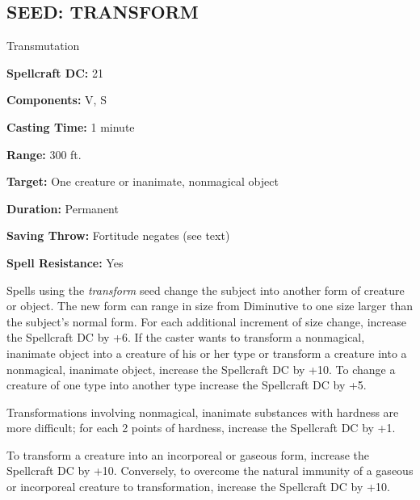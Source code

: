 \documentclass{article}
\begin{document}
\vspace{12pt}
\subsection*{SEED: TRANSFORM }

Transmutation 

\textbf{Spellcraft DC:} 21 

\textbf{Components:} V, S 

\textbf{Casting Time:} 1 minute 

\textbf{Range:} 300 ft. 

\textbf{Target:} One creature or inanimate, nonmagical object 

\textbf{Duration:} Permanent 

\textbf{Saving Throw:} Fortitude negates (see text) 

\textbf{Spell Resistance:} Yes 

Spells using the \textit{transform }seed change the subject into another form of 
creature or object. The new form can range in size from Diminutive to one size 
larger than the subject's normal form. For each additional increment of size change, 
increase the Spellcraft DC by +6. If the caster wants to transform a nonmagical, 
inanimate object into a creature of his or her type or transform a creature into 
a nonmagical, inanimate object, increase the Spellcraft DC by +10. To change a 
creature of one type into another type increase the Spellcraft DC by +5. 

Transformations involving nonmagical, inanimate substances with hardness are more 
difficult; for each 2 points of hardness, increase the Spellcraft DC by +1. 

To transform a creature into an incorporeal or gaseous form, increase the Spellcraft 
DC by +10. Conversely, to overcome the natural immunity of a gaseous or incorporeal 
creature to transformation, increase the Spellcraft DC by +10. 
\end{document}
